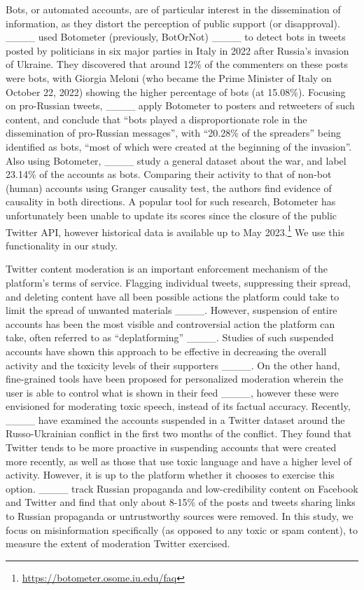 
Bots, or automated accounts, are of particular interest in the dissemination of information, as they distort the perception of public support (or disapproval).
____ used Botometer (previously, BotOrNot) ____ to detect bots in tweets posted by politicians in six major parties in Italy in 2022 after Russia's invasion of Ukraine. 
They discovered that around 12\% of the commenters on these posts were bots, with Giorgia Meloni (who became the Prime Minister of Italy on October 22, 2022) showing the higher percentage of bots (at 15.08\%).
Focusing on pro-Russian tweets, ____ apply Botometer to posters and retweeters of such content, and conclude that ``bots played a disproportionate role in the dissemination of pro-Russian messages'', with ``20.28\% of the spreaders'' being identified as bots, ``most of which were created at the beginning of the invasion''.
Also using Botometer, ____ study a general dataset about the war, and label 23.14\% of the accounts as bots. 
Comparing their activity to that of non-bot (human) accounts using Granger causality test, the authors find evidence of causality in both directions. 
A popular tool for such research, Botometer has unfortunately been unable to update its scores since the closure of the public Twitter API, however historical data is available up to May 2023.\footnote{\url{https://botometer.osome.iu.edu/faq}}
We use this functionality in our study.


Twitter content moderation is an important enforcement mechanism of the platform's terms of service. 
Flagging individual tweets, suppressing their spread, and deleting content have all been possible actions the platform could take to limit the spread of unwanted materials ____. 
However, suspension of entire accounts has been the most visible and controversial action the platform can take, often referred to as ``deplatforming'' ____.
Studies of such suspended accounts have shown this approach to be effective in decreasing the overall activity and the toxicity levels of their supporters ____.
On the other hand, fine-grained tools have been proposed for personalized moderation wherein the user is able to control what is shown in their feed ____, however these were envisioned for moderating toxic speech, instead of its factual accuracy.
Recently, ____ have examined the accounts suspended in a Twitter dataset around the Russo-Ukrainian conflict in the first two months of the conflict. 
They found that Twitter tends to be more proactive in suspending accounts that were created more recently, as well as those that use toxic language and have a higher level of activity. 
However, it is up to the platform whether it chooses to exercise this option.
____ track Russian propaganda and low-credibility content on Facebook and Twitter and find that only about 8-15\% of the posts and tweets sharing links to Russian propaganda or untrustworthy sources were removed.
In this study, we focus on misinformation specifically (as opposed to any toxic or spam content), to measure the extent of moderation Twitter exercised.



